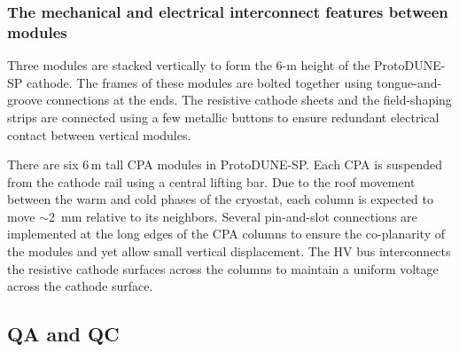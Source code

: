 \subsubsection{The mechanical and electrical interconnect features between modules}

Three modules are stacked vertically to form the 6-m height of the ProtoDUNE-SP  cathode.  The frames of these modules are bolted together using tongue-and-groove connections at the ends. The resistive cathode sheets and the field-shaping strips are connected using a few metallic buttons to ensure redundant electrical contact between vertical modules.

There are six 6\,m tall CPA modules in  ProtoDUNE-SP.  Each CPA is suspended from the cathode rail using a central lifting bar.  Due to the  roof movement between the warm and cold phases of the cryostat, each column is expected to move $\sim$2~mm relative to its neighbors.  Several pin-and-slot connections are implemented at the long edges of the CPA columns to ensure the co-planarity of the modules and yet allow small vertical displacement.  The HV bus interconnects the resistive cathode surfaces across the columns to maintain a uniform voltage across the cathode surface.

\subsection{QA and QC}


